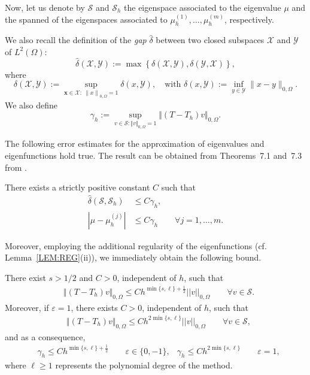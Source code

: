 \documentclass[onefignum,onetabnum,final]{siamart250211}
\numberwithin{equation}{section}
\newcommand\0{\boldsymbol{0}}
\renewcommand\O{\Omega}
\begin{document}
	Now, let us denote by $\mathcal{S}$ and $\mathcal{S}_h$ the
	eigenspace associated to the eigenvalue $\mu$ and the spanned
	of the eigenspaces associated to $\mu_h^{(1)},\ldots,\mu_h^{(m)}$, respectively.
	
	We also recall the definition of the \textit{gap} $\hat{\delta}$ between two closed
	subspaces $\mathcal{X}$ and $\mathcal{Y}$ of $L^2(\O)$:
	$$
	\hat{\delta}(\mathcal{X},\mathcal{Y})
	:=\max\left\{\delta(\mathcal{X},\mathcal{Y}),\delta(\mathcal{Y},\mathcal{X})\right\},$$
	where
	$$
	\delta(\mathcal{X},\mathcal{Y})
	:=\sup_{\mathbf{x}\in\mathcal{X}:\
		\left\|x\right\|_{0,\O}=1}\delta(x,\mathcal{Y}),
	\quad\text{with }\delta(x,\mathcal{Y}):=
	\inf_{y\in\mathcal{Y}}\|x-y\|_{0,\O}.$$
	We also define  $$\gamma_h:=\sup\limits_{v\in \mathcal{S}:\Vert v\Vert_{0,\O}=1}
	\Vert(T-T_h)v\Vert_{0,\O}.$$
	
	
	
	
	The following error estimates for the approximation
	of eigenvalues and eigenfunctions hold true.
	The result can be obtained from Theorems~7.1 and~7.3 from \cite{BO}.
	
	\begin{theorem}
		\label{gap}
		There exists a strictly positive constant $C$ such that
		\begin{align}
			\hat{\delta}(\mathcal{S},\mathcal{S}_h)
			& \leq C \gamma_h,\nonumber\\
			\left|\mu-\mu_h^{(j)}\right|
			& \le C \gamma_h \qquad \forall j=1,\ldots,m.\nonumber
		\end{align}
	\end{theorem}
	
	Moreover, employing the additional regularity of the eigenfunctions (cf. Lemma~\ref{LEM:REG}(ii)),
	we immediately obtain the following bound.
	
	\begin{theorem}\label{gapr}
		There exist $s> 1/2$ and $C>0$, independent of $h$, such that
		\begin{align}
			&\Vert(T-T_h)v\Vert_{0,\O}
			\le C h^{\min\{s,\ell\}+\frac{1}{2}}||v||_{0,\O}\qquad \forall
			v\in \mathcal{S}.\label{bou_gamma_h}
		\end{align}
		Moreover, if $\varepsilon  = 1$, there exists $C > 0$,
		independent of $h$, such that
		\begin{align}
			&\Vert(T-T_h)v\Vert_{0,\O}
			\le C h^{2\min\{s,\ell\}}||v||_{0,\O}\qquad \forall
			v\in \mathcal{S},\label{bou2_gamma_h}
		\end{align}
		and as a consequence,
		$$
		\begin{aligned}
			&\gamma_h \leq C h^{\min\{s,\ell\}+\frac{1}{2}}\qquad \varepsilon\in\{0,-1\}, %
			&\gamma_h \leq C h^{2\min\{s,\ell\}}\qquad \varepsilon=1, %
		\end{aligned}
		$$
		where $\ell\ge1$ represents the polynomial degree of the method.
	\end{theorem}
	
\end{document}
